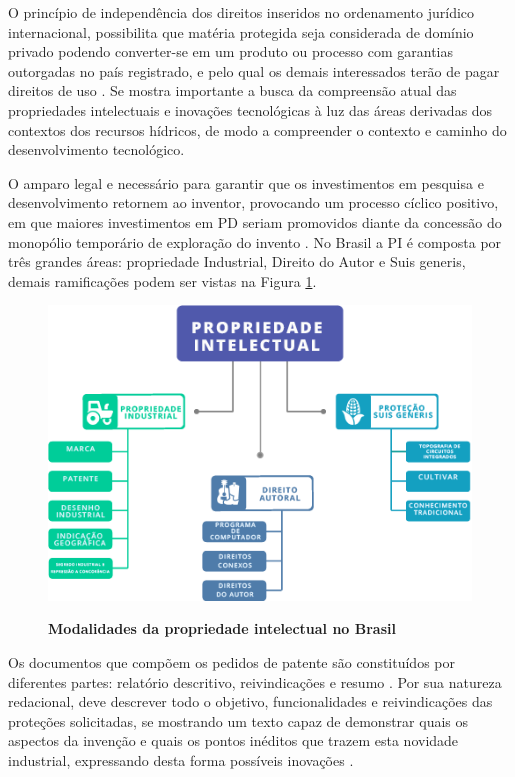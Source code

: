 O princípio de independência dos direitos inseridos no ordenamento jurídico internacional, possibilita que matéria protegida seja considerada de domínio privado podendo converter-se em um produto ou processo com garantias outorgadas no país registrado, e pelo qual os demais interessados terão de pagar direitos de uso \cite{galvao_direitos_2002}. Se mostra importante a busca da compreensão atual das propriedades intelectuais e inovações tecnológicas à luz das áreas derivadas dos contextos dos recursos hídricos, de modo a compreender o contexto e caminho do desenvolvimento tecnológico.

O amparo legal e necessário para garantir que os investimentos em pesquisa e desenvolvimento retornem ao inventor, provocando um processo cíclico positivo, em que maiores investimentos em PD seriam promovidos diante da concessão do monopólio temporário de exploração do invento \cite{lima_sauglobal_2017}. No Brasil a PI é composta por três grandes áreas: propriedade Industrial, Direito do Autor e Suis generis, demais ramificações podem ser vistas na Figura \ref{figura_4}.


\begin{figure}[H]
\centering
\caption{\textbf{Modalidades da propriedade intelectual no Brasil}}
\includegraphics[scale=0.8]{Imagens/propriedade_intelectual.png}
\label{figura_4}
\end{figure}


Os documentos que compõem os pedidos de patente são constituídos por diferentes partes: relatório descritivo, reivindicações e resumo \cite{inpi_diretrizes_2011}. Por sua natureza redacional, deve descrever todo o objetivo, funcionalidades e reivindicações das proteções solicitadas, se mostrando um texto capaz de demonstrar quais os aspectos da invenção e quais os pontos inéditos que trazem esta novidade industrial, expressando desta forma possíveis inovações \cite{wipo_global_2018}.  


